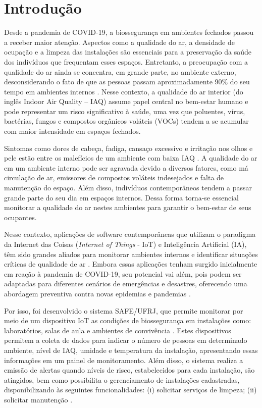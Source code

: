 \newpage
\section{Introdução}
\label{sec:introducao}

Desde a pandemia de COVID-19, a biossegurança em ambientes fechados passou a receber maior atenção. Aspectos como a qualidade do ar, a densidade de ocupação e a limpeza das instalações são essenciais para a preservação da saúde dos indivíduos que frequentam esses espaços. Entretanto, a preocupação com a qualidade do ar ainda se concentra, em grande parte, no ambiente externo, desconsiderando o fato de que as pessoas passam aproximadamente 90\% do seu tempo em ambientes internos \cite{WHO2014MultipleExposure}. Nesse contexto, a qualidade do ar interior (do inglês Indoor Air Quality – IAQ) assume papel central no bem-estar humano e pode representar um risco significativo à saúde, uma vez que poluentes, vírus, bactérias, fungos e compostos orgânicos voláteis (VOCs) tendem a se acumular com maior intensidade em espaços fechados.

Sintomas como dores de cabeça, fadiga, cansaço excessivo e irritação nos olhos e pele estão entre os malefícios de um ambiente com baixa IAQ \cite{SAFE-IOT}. A qualidade do ar em um ambiente interno pode ser agravada devido a diversos fatores, como má circulação de ar, emissores de compostos voláteis indesejados e falta de manutenção do espaço. Além disso, indivíduos contemporâneos tendem a passar grande parte do seu dia em espaços internos. Dessa forma torna-se essencial monitorar a qualidade do ar nestes ambientes para garantir o bem-estar de seus ocupantes. 

Nesse contexto, aplicações de software contemporâneas que utilizam o paradigma da Internet das Coisas (\textit{Internet of Things} - IoT) e Inteligência Artificial (IA), têm sido grandes aliados para monitorar ambientes internos e identificar situações críticas de qualidade de ar \cite{kelly2020internet}. Embora essas aplicações tenham surgido inicialmente em reação à pandemia de COVID-19, seu potencial vai além, pois podem ser adaptadas para diferentes cenários de emergências e desastres, oferecendo uma abordagem preventiva contra novas epidemias e pandemias \cite{MoniPaEp, SAFE-IOT, Oliveira2025HospitaisSeguros}.

Por isso, foi desenvolvido o sistema SAFE/UFRJ, que permite monitorar por meio de um dispositivo IoT as condições de biossegurança \cite{UFRJBiosseguranca2020} em instalações como: laboratórios, salas de aula e ambientes de convivência \cite{rios2022exploring}. Estes dispositivos permitem a coleta de dados para indicar o número de pessoas em determinado ambiente, nível de IAQ, umidade e temperatura da instalação, apresentando essas informações em um painel de monitoramento. Além disso, o sistema realiza a emissão de alertas quando níveis de risco, estabelecidos para cada instalação, são atingidos, bem como possibilita o gerenciamento de instalações cadastradas, disponibilizando às seguintes funcionalidades: (i) solicitar serviços de limpeza; (ii) solicitar manutenção \cite{SAFE-IOT}.

